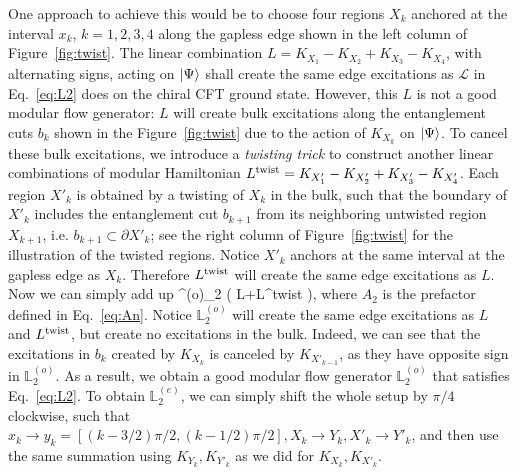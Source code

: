 \documentclass[12pt, nofootinbib]{article}
\theoremstyle{plain}
\theoremstyle{assumption}
\theoremstyle{definition}
\theoremstyle{plain}
\theoremstyle{plain}
\theoremstyle{plain}
\theoremstyle{plain}
\theoremstyle{plain}
\def\Lbe{\mathbb{L}^{(e)}}
\def\Lbo{\mathbb{L}^{(o)}}
\def\Lcft{\mathscr{L}}
\def\({\left(}
\def\){\right)}
\begin{document}
One approach to achieve this would be to choose four regions 
$X_k$ anchored at the interval $x_k$, $k=1,2,3,4$ along the gapless edge shown in the left column of Figure~\ref{fig:twist}. The linear combination $L = K_{X_1}-K_{X_2}+K_{X_3}-K_{X_4}$, with alternating signs, acting on $\left|\Psi\right\rangle$ shall create the same edge excitations as $\Lcft$ in Eq.~\eqref{eq:L2} does on the chiral CFT ground state. However, this $L$ is not a good modular flow generator: $L$ will create bulk excitations along the entanglement cuts $b_k$ shown in the Figure~\ref{fig:twist} due to the action of $K_{X_k}$ on $\left|\Psi\right\rangle$. 
To cancel these bulk excitations, we introduce a \emph{twisting trick} to construct another linear combinations of modular Hamiltonian $L^{\rm twist} = K_{X'_1}-K_{X'_2}+K_{X'_3}-K_{X'_4}$. Each region $X'_k$ is obtained by a twisting of $X_k$ in the bulk, such that the boundary of $X'_k$ includes the entanglement cut $b_{k+1}$ from its neighboring untwisted region $X_{k+1}$, i.e. $b_{k+1}\subset \partial X'_{k}$; see the right column of Figure~\ref{fig:twist} for the illustration of the twisted regions. Notice $X'_k$ anchors at the same interval at the gapless edge as $X_k$. 
Therefore $L^{\rm twist}$ will create the same edge excitations as $L$. Now we can simply add up 
\be \Lbo_2  \( L+L^{\rm twist} \),\ee
where $A_2$ is the prefactor defined in Eq.~\eqref{eq:An}.
Notice $\Lbo_2$ will create the same edge excitations as $L$ and $L^{\rm twist}$, but create no excitations in the bulk. Indeed, we can see that the excitations in $b_k$ created by $K_{X_k}$ is canceled by $K_{X'_{k-1}}$, as they have opposite sign in $\Lbo_2$. As a result, we obtain a good modular flow generator $\Lbo_2$ that satisfies Eq.~\eqref{eq:L2}. To obtain $\Lbe_2$, we can simply shift the whole setup by $\pi/4$ clockwise, such that $x_k \to y_k = [(k-3/2)\pi/2, (k-1/2)\pi/2],X_k \to Y_k, X'_k \to Y'_k$, and then use the same summation using $K_{Y_k},K_{Y'_k}$ as we did for $K_{X_k},K_{X'_k}$. 
\end{document}
